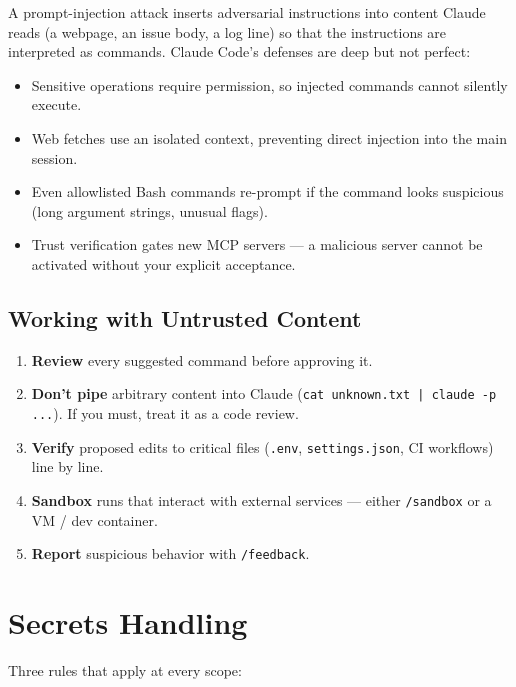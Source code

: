 A prompt-injection attack inserts adversarial instructions into content
Claude reads (a webpage, an issue body, a log line) so that the
instructions are interpreted as commands. Claude Code's defenses are
deep but not perfect:

\begin{itemize}
  \item Sensitive operations require permission, so injected commands
        cannot silently execute.
  \item Web fetches use an isolated context, preventing direct
        injection into the main session.
  \item Even allowlisted Bash commands re-prompt if the command looks
        suspicious (long argument strings, unusual flags).
  \item Trust verification gates new MCP servers — a malicious server
        cannot be activated without your explicit acceptance.
\end{itemize}

\subsection{Working with Untrusted Content}

\begin{enumerate}
  \item \textbf{Review} every suggested command before approving it.
  \item \textbf{Don't pipe} arbitrary content into Claude
        (\texttt{cat unknown.txt | claude -p ...}). If you must, treat
        it as a code review.
  \item \textbf{Verify} proposed edits to critical files
        (\texttt{.env}, \texttt{settings.json}, CI workflows) line by
        line.
  \item \textbf{Sandbox} runs that interact with external services —
        either \texttt{/sandbox} or a VM / dev container.
  \item \textbf{Report} suspicious behavior with \texttt{/feedback}.
\end{enumerate}

\section{Secrets Handling}
\label{sec:secrets}


Three rules that apply at every scope:

